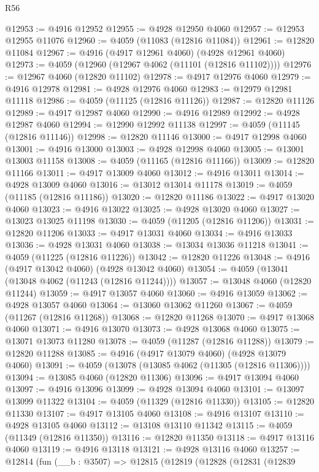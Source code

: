 \begin{lexlean}{R56}
\begin{coremodule}
@12953 := @4916 @12952
@12955 := @4928 @12950 @4060
@12957 := @12953 @12955 @11076
@12960 := @4059 (@11083 (@12816 @11084))
@12961 := @12820 @11084
@12967 := @4916 (@4917 @12961 @4060) (@4928 @12961 @4060)
@12973 := @4059 (@12960 (@12967 @4062 (@11101 (@12816 @11102))))
@12976 := @12967 @4060 (@12820 @11102)
@12978 := @4917 @12976 @4060
@12979 := @4916 @12978
@12981 := @4928 @12976 @4060
@12983 := @12979 @12981 @11118
@12986 := @4059 (@11125 (@12816 @11126))
@12987 := @12820 @11126
@12989 := @4917 @12987 @4060
@12990 := @4916 @12989
@12992 := @4928 @12987 @4060
@12994 := @12990 @12992 @11138
@12997 := @4059 (@11145 (@12816 @11146))
@12998 := @12820 @11146
@13000 := @4917 @12998 @4060
@13001 := @4916 @13000
@13003 := @4928 @12998 @4060
@13005 := @13001 @13003 @11158
@13008 := @4059 (@11165 (@12816 @11166))
@13009 := @12820 @11166
@13011 := @4917 @13009 @4060
@13012 := @4916 @13011
@13014 := @4928 @13009 @4060
@13016 := @13012 @13014 @11178
@13019 := @4059 (@11185 (@12816 @11186))
@13020 := @12820 @11186
@13022 := @4917 @13020 @4060
@13023 := @4916 @13022
@13025 := @4928 @13020 @4060
@13027 := @13023 @13025 @11198
@13030 := @4059 (@11205 (@12816 @11206))
@13031 := @12820 @11206
@13033 := @4917 @13031 @4060
@13034 := @4916 @13033
@13036 := @4928 @13031 @4060
@13038 := @13034 @13036 @11218
@13041 := @4059 (@11225 (@12816 @11226))
@13042 := @12820 @11226
@13048 := @4916 (@4917 @13042 @4060) (@4928 @13042 @4060)
@13054 := @4059 (@13041 (@13048 @4062 (@11243 (@12816 @11244))))
@13057 := @13048 @4060 (@12820 @11244)
@13059 := @4917 @13057 @4060
@13060 := @4916 @13059
@13062 := @4928 @13057 @4060
@13064 := @13060 @13062 @11260
@13067 := @4059 (@11267 (@12816 @11268))
@13068 := @12820 @11268
@13070 := @4917 @13068 @4060
@13071 := @4916 @13070
@13073 := @4928 @13068 @4060
@13075 := @13071 @13073 @11280
@13078 := @4059 (@11287 (@12816 @11288))
@13079 := @12820 @11288
@13085 := @4916 (@4917 @13079 @4060) (@4928 @13079 @4060)
@13091 := @4059 (@13078 (@13085 @4062 (@11305 (@12816 @11306))))
@13094 := @13085 @4060 (@12820 @11306)
@13096 := @4917 @13094 @4060
@13097 := @4916 @13096
@13099 := @4928 @13094 @4060
@13101 := @13097 @13099 @11322
@13104 := @4059 (@11329 (@12816 @11330))
@13105 := @12820 @11330
@13107 := @4917 @13105 @4060
@13108 := @4916 @13107
@13110 := @4928 @13105 @4060
@13112 := @13108 @13110 @11342
@13115 := @4059 (@11349 (@12816 @11350))
@13116 := @12820 @11350
@13118 := @4917 @13116 @4060
@13119 := @4916 @13118
@13121 := @4928 @13116 @4060
@13257 := @12814
    (fun (__b : @3507) =>
    @12815
      (@12819
        (@12828
          (@12831
            (@12839

\end{coremodule}
\end{lexlean}
